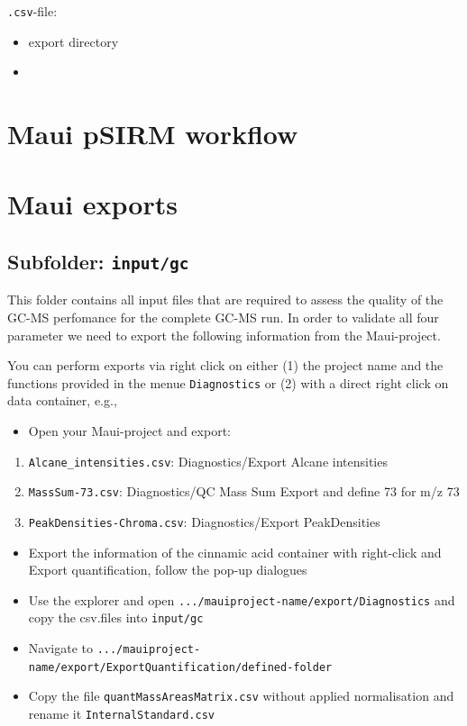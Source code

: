 \documentclass[]{book}
\providecommand{\tightlist}{%
  \setlength{\itemsep}{0pt}\setlength{\parskip}{0pt}}
\theoremstyle{definition}
\theoremstyle{definition}
\theoremstyle{definition}
\theoremstyle{remark}
\begin{document}
\texttt{.csv}-file:

\begin{itemize}
\item
  export directory
\item
\end{itemize}

\section{Maui pSIRM workflow}\label{mauipsirm}

\section{Maui exports}\label{mauiexport}

\subsection{\texorpdfstring{Subfolder:
\texttt{input/gc}}{Subfolder: input/gc}}\label{subfolder-inputgc}

This folder contains all input files that are required to assess the
quality of the GC-MS perfomance for the complete GC-MS run. In order to
validate all four parameter we need to export the following information
from the Maui-project.

You can perform exports via right click on either (1) the project name
and the functions provided in the menue \texttt{Diagnostics} or (2) with
a direct right click on data container, e.g.,

\begin{itemize}
\tightlist
\item
  Open your Maui-project and export:
\end{itemize}

\begin{enumerate}
\def\labelenumi{\arabic{enumi}.}
\tightlist
\item
  \texttt{Alcane\_intensities.csv}: Diagnostics/Export Alcane
  intensities
\item
  \texttt{MassSum-73.csv}: Diagnostics/QC Mass Sum Export and define 73
  for m/z 73
\item
  \texttt{PeakDensities-Chroma.csv}: Diagnostics/Export PeakDensities
\end{enumerate}

\begin{itemize}
\tightlist
\item
  Export the information of the cinnamic acid container with right-click
  and Export quantification, follow the pop-up dialogues
\item
  Use the explorer and open
  \texttt{.../mauiproject-name/export/Diagnostics} and copy the
  csv.files into \texttt{input/gc}
\item
  Navigate to
  \texttt{.../mauiproject-name/export/ExportQuantification/defined-folder}
\item
  Copy the file \texttt{quantMassAreasMatrix.csv} without applied
  normalisation and rename it \texttt{InternalStandard.csv}
\end{itemize}
\end{document}

